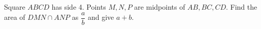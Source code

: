 Square $ABCD$ has side 4. Points $M,N,P$ are midpoints of $AB,BC,CD$. Find the area of $DMN\cap ANP$ as $\dfrac{a}{b}$ and give $a+b$.
